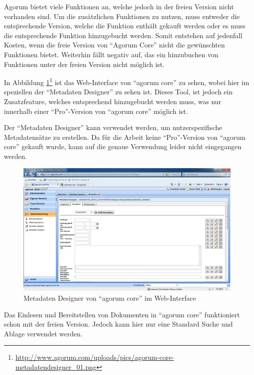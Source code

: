 Agorum bietet viele Funktionen an, welche jedoch in der freien Version nicht vorhanden sind. Um die zus\"atzlichen Funktionen zu nutzen, muss entweder die ents\"prechende Version, welche die Funktion enth\"alt gekauft werden oder es muss die entsprechende Funktion hinzugebucht werden.
Somit entstehen auf jedenfall Kosten, wenn die freie Version von "`Agorum Core"' nicht die gew\"unschten Funktionen bietet. Weiterhin f\"allt negativ auf, das ein hinzubuchen von Funktionen unter der freien Version nicht m\"oglich ist. \cite{agorum_preise} \cite{Eval_DMS_Bachelor}

In Abbildung \ref{metadatendesigner agorum}\footnote{\url{http://www.agorum.com/uploads/pics/agorum-core-metadatendesigner_01.png}} ist das Web-Interface von "`agorum core"' zu sehen, wobei hier im speziellen der "`Metadaten Designer"' zu sehen ist. Dieses Tool, ist jedoch ein Zusatzfeature, welches entsprechend hinzugebucht werden muss, was nur innerhalb einer "`Pro"'-Version von "`agorum core"' m\"oglich ist. \cite{agorum_metadesigner_bild}

Der "`Metadaten Designer"' kann verwendet werden, um nutzerspezifische Metadatens\"atze zu erstellen.  Da f\"ur die Arbeit keine "`Pro"'-Version von "`agorum core"' gekauft wurde, kann auf die genaue Verwendung leider nicht eingegangen werden. \cite{agorum_metadaten_designer_video}

\begin{figure}[!ht]
\centering
\includegraphics[width=16cm]{Bilder/agorum-core-metadatendesigner.png}
\caption{Metadaten Designer von "`agorum core"' im Web-Interface}
\label{metadatendesigner agorum}
\centering
\end{figure}

Das Einlesen und Bereitstellen von Dokumenten in "`agorum core"' funktioniert schon mit der freien Version. Jedoch kann hier nur eine Standard Suche und Ablage verwendet werden. \cite{agorum_preise}

